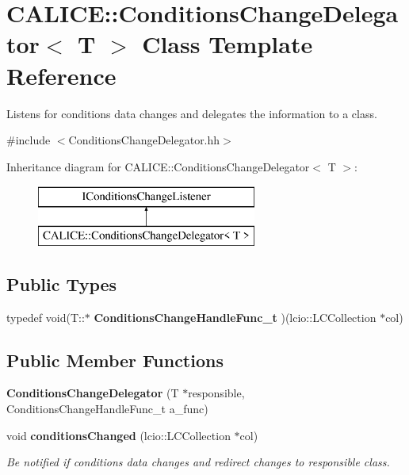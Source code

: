 \section{C\-A\-L\-I\-C\-E\-:\-:Conditions\-Change\-Delegator$<$ T $>$ Class Template Reference}
\label{classCALICE_1_1ConditionsChangeDelegator}


Listens for conditions data changes and delegates the information to a class.  




{\ttfamily \#include $<$Conditions\-Change\-Delegator.\-hh$>$}

Inheritance diagram for C\-A\-L\-I\-C\-E\-:\-:Conditions\-Change\-Delegator$<$ T $>$\-:\begin{figure}[H]
\begin{center}
\leavevmode
\includegraphics[height=2.000000cm]{classCALICE_1_1ConditionsChangeDelegator}
\end{center}
\end{figure}
\subsection*{Public Types}
\begin{DoxyCompactItemize}
\item 
typedef void(T\-::$\ast$ {\bfseries Conditions\-Change\-Handle\-Func\-\_\-t} )(lcio\-::\-L\-C\-Collection $\ast$col)\label{classCALICE_1_1ConditionsChangeDelegator_afd68318ab8917fd1f97d18ae8204c167}

\end{DoxyCompactItemize}
\subsection*{Public Member Functions}
\begin{DoxyCompactItemize}
\item 
{\bfseries Conditions\-Change\-Delegator} (T $\ast$responsible, Conditions\-Change\-Handle\-Func\-\_\-t a\-\_\-func)\label{classCALICE_1_1ConditionsChangeDelegator_a724d008ad96b77fa64b8716545052b57}

\item 
void {\bf conditions\-Changed} (lcio\-::\-L\-C\-Collection $\ast$col)
\begin{DoxyCompactList}\small\item\em Be notified if conditions data changes and redirect changes to responsible class. \end{DoxyCompactList}\end{DoxyCompactItemize}
